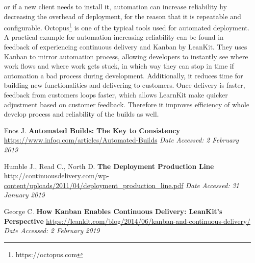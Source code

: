 \documentclass[12pt]{article}
\begin{document}
or if a new client needs to install it, automation can increase reliability
by decreasing the overhead of deployment, for the reason that it is repeatable and configurable.
Octopus\footnote{https://octopus.com} is one of the typical tools used for 
automated deployment. \\[5px]
A practical example for automation increasing reliability can be found 
in feedback of experiencing continuous delivery and Kanban by LeanKit. 
They uses Kanban to mirror automation process, allowing developers to 
instantly see where work flows and where work gets stuck, in which way 
they can stop in time if automation a bad process during development. 
Additionally, it reduces time for building new functionalities and 
delivering to customers. Once delivery is faster, feedback from customers
loops faster, which allows LearnKit make quicker adjustment 
based on customer feedback\cite{Kanban}. Therefore it improves efficiency of whole develop process
and reliability of the builds as well. 

{\footnotesize
\begin{thebibliography}{9}
  Enos J. \textbf{Automated Builds: The Key to Consistency}
  \url{https://www.infoq.com/articles/Automated-Builds}
  \textit{Date Accessed: 2 February 2019}

    Humble J., Read C., North D. \textbf{The Deployment Production Line}
    \url{http://continuousdelivery.com/wp-content/uploads/2011/04/deployment_production_line.pdf}
    \textit{Date Accessed: 31 January 2019}

    George C. \textbf{How Kanban Enables Continuous Delivery: LeanKit's Perspective}
    \url{https://leankit.com/blog/2014/06/kanban-and-continuous-delivery/}
    \textit{Date Accessed: 2 February 2019}
\end{thebibliography}
}
\end{document}
